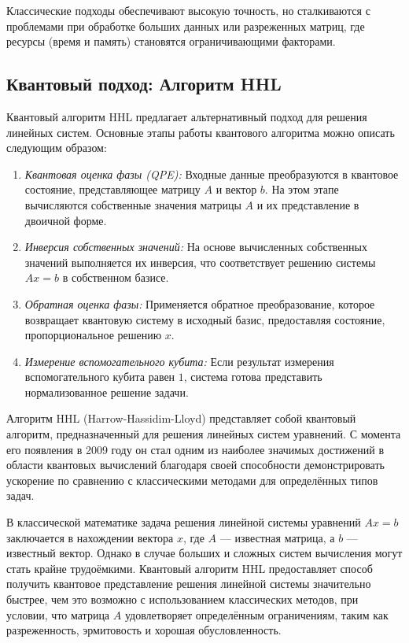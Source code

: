 Классические подходы обеспечивают высокую точность, но сталкиваются с проблемами при обработке больших данных или разреженных матриц, где ресурсы (время и память) становятся ограничивающими факторами.

\subsection*{Квантовый подход: Алгоритм HHL}

Квантовый алгоритм HHL предлагает альтернативный подход для решения линейных систем. Основные этапы работы квантового алгоритма можно описать следующим образом:

\begin{enumerate}
    \item \emph{Квантовая оценка фазы (QPE):} Входные данные преобразуются в квантовое состояние, представляющее матрицу $A$ и вектор $b$. На этом этапе вычисляются собственные значения матрицы $A$ и их представление в двоичной форме.
    \item \emph{Инверсия собственных значений:} На основе вычисленных собственных значений выполняется их инверсия, что соответствует решению системы $Ax = b$ в собственном базисе.
    \item \emph{Обратная оценка фазы:} Применяется обратное преобразование, которое возвращает квантовую систему в исходный базис, предоставляя состояние, пропорциональное решению $x$.
    \item \emph{Измерение вспомогательного кубита:} Если результат измерения вспомогательного кубита равен $1$, система готова представить нормализованное решение задачи.
\end{enumerate}

\textbf{}
Алгоритм HHL (Harrow-Hassidim-Lloyd) представляет собой квантовый алгоритм, предназначенный для решения линейных систем уравнений. С момента его появления в 2009 году он стал одним из наиболее значимых достижений в области квантовых вычислений благодаря своей способности демонстрировать ускорение по сравнению с классическими методами для определённых типов задач.

В классической математике задача решения линейной системы уравнений $Ax = b$ заключается в нахождении вектора $x$, где $A$ — известная матрица, а $b$ — известный вектор. Однако в случае больших и сложных систем вычисления могут стать крайне трудоёмкими. Квантовый алгоритм HHL предоставляет способ получить квантовое представление решения линейной системы значительно быстрее, чем это возможно с использованием классических методов, при условии, что матрица $A$ удовлетворяет определённым ограничениям, таким как разреженность, эрмитовость и хорошая обусловленность.

